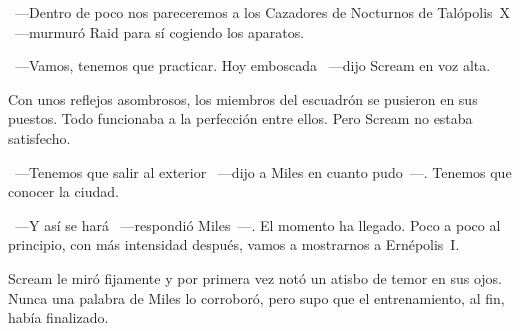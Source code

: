 ~---Dentro de poco nos pareceremos a los Cazadores de Nocturnos de Talópolis~X ~---murmuró Raid para sí cogiendo los aparatos.

~---Vamos, tenemos que practicar. Hoy emboscada ~---dijo Scream en voz alta.

Con unos reflejos asombrosos, los miembros del escuadrón se pusieron en sus puestos. Todo funcionaba a la perfección entre ellos. Pero Scream no estaba satisfecho.

~---Tenemos que salir al exterior ~---dijo a Miles en cuanto pudo~---. Tenemos que conocer la ciudad.

~---Y así se hará ~---respondió Miles~---. El momento ha llegado. Poco a poco al principio, con más intensidad después, vamos a mostrarnos a Ernépolis~I.

Scream le miró fijamente y por primera vez notó un atisbo de temor en sus ojos. Nunca una palabra de Miles lo corroboró, pero supo que el entrenamiento, al fin, había finalizado.

\endinput
